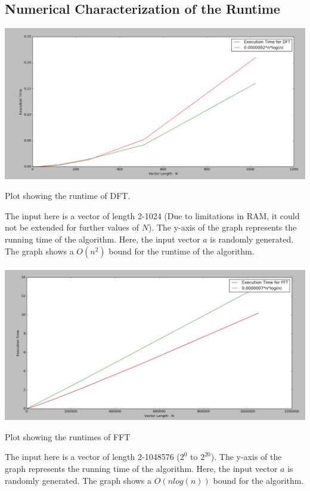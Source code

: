 \documentclass{article}
\begin{document}
\subsection{Numerical Characterization of the Runtime}
\includegraphics[scale=0.3]{dft}
\begin{center}
Plot showing the runtime of DFT.  \\
\end{center}
The input here is a vector of length 2-1024 (Due to limitations in RAM, it could not be extended for further values of $N$). The y-axis of the graph represents the running time of the algorithm. Here, the input vector $a$ is randomly generated. The graph shows a $O(n^{2})$ bound for the runtime of the algorithm.\\ \\
\includegraphics[scale=0.3]{fft}
\begin{center}
Plot showing the runtimes of FFT
\end{center}
The input here is a vector of length 2-1048576 ($2^{0}$ to $2^{20}$). The y-axis of the graph represents the running time of the algorithm. Here, the input vector $a$ is randomly generated. The graph shows a $O(nlog(n))$ bound for the algorithm. \\ \\
\end{document}
